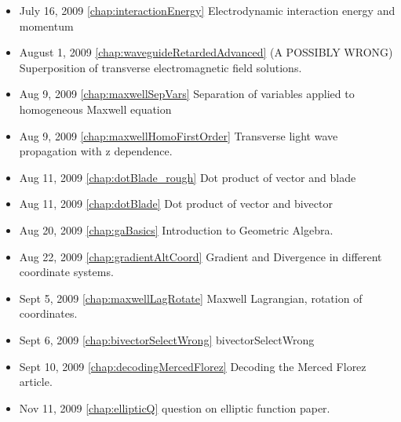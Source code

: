 \begin{itemize}
\item July 16, 2009 \ref{chap:interactionEnergy} Electrodynamic interaction energy and momentum

\item August 1, 2009 \ref{chap:waveguideRetardedAdvanced} (A POSSIBLY WRONG) Superposition of transverse electromagnetic field solutions.

\item Aug 9, 2009 \ref{chap:maxwellSepVars} Separation of variables applied to homogeneous Maxwell equation

\item Aug 9, 2009 \ref{chap:maxwellHomoFirstOrder} Transverse light wave propagation with z dependence.

\item Aug 11, 2009 \ref{chap:dotBlade_rough} Dot product of vector and blade

\item Aug 11, 2009 \ref{chap:dotBlade} Dot product of vector and bivector

\item Aug 20, 2009 \ref{chap:gaBasics} Introduction to Geometric Algebra.

\item Aug 22, 2009 \ref{chap:gradientAltCoord} Gradient and Divergence in different coordinate systems.

\item Sept 5, 2009 \ref{chap:maxwellLagRotate} Maxwell Lagrangian, rotation of coordinates.

\item Sept 6, 2009 \ref{chap:bivectorSelectWrong} bivectorSelectWrong

\item Sept 10, 2009 \ref{chap:decodingMercedFlorez} Decoding the Merced Florez article.

\item Nov 11, 2009 \ref{chap:ellipticQ} question on elliptic function paper.

\end{itemize}
